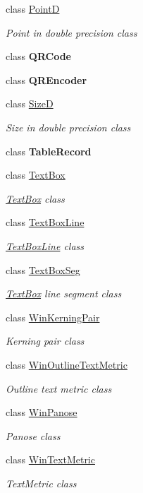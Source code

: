 \begin{DoxyCompactItemize}
class \hyperlink{class_pdf_file_writer_1_1_point_d}{PointD}
\begin{DoxyCompactList}\small\item\em Point in double precision class \end{DoxyCompactList}\item 
class {\bfseries Q\+R\+Code}
\item 
class {\bfseries Q\+R\+Encoder}
\item 
class \hyperlink{class_pdf_file_writer_1_1_size_d}{SizeD}
\begin{DoxyCompactList}\small\item\em Size in double precision class \end{DoxyCompactList}\item 
class {\bfseries Table\+Record}
\item 
class \hyperlink{class_pdf_file_writer_1_1_text_box}{Text\+Box}
\begin{DoxyCompactList}\small\item\em \hyperlink{class_pdf_file_writer_1_1_text_box}{Text\+Box} class \end{DoxyCompactList}\item 
class \hyperlink{class_pdf_file_writer_1_1_text_box_line}{Text\+Box\+Line}
\begin{DoxyCompactList}\small\item\em \hyperlink{class_pdf_file_writer_1_1_text_box_line}{Text\+Box\+Line} class \end{DoxyCompactList}\item 
class \hyperlink{class_pdf_file_writer_1_1_text_box_seg}{Text\+Box\+Seg}
\begin{DoxyCompactList}\small\item\em \hyperlink{class_pdf_file_writer_1_1_text_box}{Text\+Box} line segment class \end{DoxyCompactList}\item 
class \hyperlink{class_pdf_file_writer_1_1_win_kerning_pair}{Win\+Kerning\+Pair}
\begin{DoxyCompactList}\small\item\em Kerning pair class \end{DoxyCompactList}\item 
class \hyperlink{class_pdf_file_writer_1_1_win_outline_text_metric}{Win\+Outline\+Text\+Metric}
\begin{DoxyCompactList}\small\item\em Outline text metric class \end{DoxyCompactList}\item 
class \hyperlink{class_pdf_file_writer_1_1_win_panose}{Win\+Panose}
\begin{DoxyCompactList}\small\item\em Panose class \end{DoxyCompactList}\item 
class \hyperlink{class_pdf_file_writer_1_1_win_text_metric}{Win\+Text\+Metric}
\begin{DoxyCompactList}\small\item\em Text\+Metric class \end{DoxyCompactList}\end{DoxyCompactItemize}

